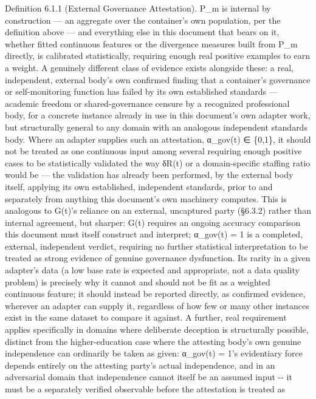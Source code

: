 \documentclass[
]{article}
\begin{document}
Definition 6.1.1 (External Governance Attestation). P\_m is internal by
construction --- an aggregate over the container's own population, per
the definition above --- and everything else in this document that bears
on it, whether fitted continuous features or the divergence measures
built from P\_m directly, is calibrated statistically, requiring enough
real positive examples to earn a weight. A genuinely different class of
evidence exists alongside these: a real, independent, external body's
own confirmed finding that a container's governance or self-monitoring
function has failed by its own established standards --- academic
freedom or shared-governance censure by a recognized professional body,
for a concrete instance already in use in this document's own adapter
work, but structurally general to any domain with an analogous
independent standards body. Where an adapter supplies such an
attestation, α\_gov(t) ∈ \{0,1\}, it should not be treated as one
continuous input among several requiring enough positive cases to be
statistically validated the way δR(t) or a domain-specific staffing
ratio would be --- the validation has already been performed, by the
external body itself, applying its own established, independent
standards, prior to and separately from anything this document's own
machinery computes. This is analogous to G(t)'s reliance on an external,
uncaptured party (§6.3.2) rather than internal agreement, but sharper:
G(t) requires an ongoing accuracy comparison this document must itself
construct and interpret; α\_gov(t) = 1 is a completed, external,
independent verdict, requiring no further statistical interpretation to
be treated as strong evidence of genuine governance dysfunction. Its
rarity in a given adapter's data (a low base rate is expected and
appropriate, not a data quality problem) is precisely why it cannot and
should not be fit as a weighted continuous feature; it should instead be
reported directly, as confirmed evidence, wherever an adapter can supply
it, regardless of how few or many other instances exist in the same
dataset to compare it against. A further, real requirement applies
specifically in domains where deliberate deception is structurally
possible, distinct from the higher-education case where the attesting
body's own genuine independence can ordinarily be taken as given:
α\_gov(t) = 1's evidentiary force depends entirely on the attesting
party's actual independence, and in an adversarial domain that
independence cannot itself be an assumed input -\/- it must be a
separately verified observable before the attestation is treated as
\end{document}
